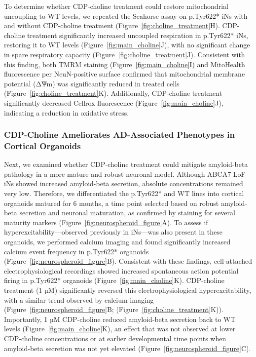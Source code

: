 To determine whether CDP-choline treatment could restore mitochondrial uncoupling to WT levels, we repeated the Seahorse assay on p.Tyr622* iNs with and without CDP-choline treatment (Figure~\ref{fig:choline_treatment}H). CDP-choline treatment significantly increased uncoupled respiration in p.Tyr622* iNs, restoring it to WT levels (Figure~\ref{fig:main_choline}J), with no significant change in spare respiratory capacity (Figure~\ref{fig:choline_treatment}J). Consistent with this finding, both TMRM staining (Figure~\ref{fig:main_choline}I) and MitoHealth fluorescence per NeuN-positive surface confirmed that mitochondrial membrane potential (ΔѰm) was significantly reduced in treated cells (Figure~\ref{fig:choline_treatment}K). Additionally, CDP-choline treatment significantly decreased Cellrox fluorescence (Figure~\ref{fig:main_choline}J), indicating a reduction in oxidative stress. 

\subsubsection{CDP-Choline Ameliorates AD-Associated Phenotypes in Cortical Organoids}
Next, we examined whether CDP-choline treatment could mitigate amyloid-beta pathology in a more mature and robust neuronal model. Although ABCA7 LoF iNs showed increased amyloid-beta secretion, absolute concentrations remained very low. Therefore, we differentiated the p.Tyr622* and WT lines into cortical organoids matured for 6 months, a time point selected based on robust amyloid-beta secretion and neuronal maturation, as confirmed by staining for several maturity markers (Figure~\ref{fig:neurospheroid_figure}A). To assess if hyperexcitability—observed previously in iNs—was also present in these organoids, we performed calcium imaging and found significantly increased calcium event frequency in p.Tyr622* organoids (Figure~\ref{fig:neurospheroid_figure}B). Consistent with these findings, cell-attached electrophysiological recordings showed increased spontaneous action potential firing in p.Tyr622* organoids (Figure~\ref{fig:main_choline}K). CDP-choline treatment (1 µM) significantly reversed this electrophysiological hyperexcitability, with a similar trend observed by calcium imaging (Figure~\ref{fig:neurospheroid_figure}B; (Figure~\ref{fig:choline_treatment}K)). Importantly, 1 µM CDP-choline reduced amyloid-beta secretion back to WT levels (Figure~\ref{fig:main_choline}K), an effect that was not observed at lower CDP-choline concentrations or at earlier developmental time points when amyloid-beta secretion was not yet elevated (Figure~\ref{fig:neurospheroid_figure}C).

    